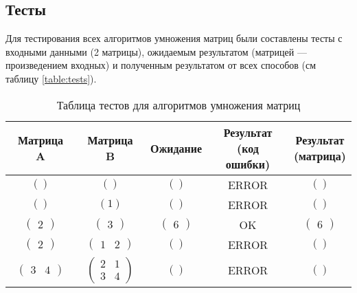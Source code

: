 \vspace{0.25cm}
\subsection{Тесты}

\hspace{1.25cm}
Для тестирования всех алгоритмов умножения матриц были составлены тесты с входными данными (2 матрицы), ожидаемым результатом (матрицей --- произведением входных) и полученным результатом от всех способов (см таблицу \ref{table:tests}).

\vspace{0.25cm}
\begin{table}[H]
    \centering
    \caption{Таблица тестов для алгоритмов умножения матриц}
    \renewcommand{\arraystretch}{1.5} %
    \begin{tabular}{|c|c|c|c|c|}
        \hline
        \textbf{Матрица A} & \textbf{Матрица B} & \textbf{Ожидание} & \makecell{\textbf{Результат}\\ \textbf{(код ошибки)}} & \makecell{\textbf{Результат}\\ \textbf{(матрица)}} \\
        \hline
        $\left( \right)$ & $\left( \right)$ & $\left( \right)$ & ERROR & $\left( \right)$ \\
        $\left( \right)$ & $\left( 1 \right)$ & $\left( \right)$ & ERROR & $\left( \right)$ \\
        $\left( \begin{matrix} 2 \end{matrix} \right)$ & $\left( \begin{matrix} 3 \end{matrix} \right)$ & $\left( \begin{matrix} 6 \end{matrix} \right)$ & OK & $\left( \begin{matrix} 6 \end{matrix} \right)$ \\
        $\left( \begin{matrix} 2 \end{matrix} \right)$ & $\left( \begin{matrix} 1 & 2 \end{matrix} \right)$ & $\left( \right)$ & ERROR & $\left( \right)$ \\
        $\left( \begin{matrix} 3 & 4 \end{matrix} \right)$ & $\left( \begin{matrix} 2 & 1 \\ 3 & 4 \end{matrix} \right)$ & $\left( \right)$ & ERROR & $\left( \right)$ \\

\end{tabular}
\end{table}
